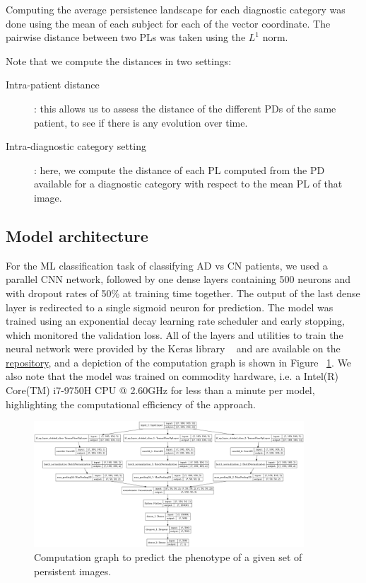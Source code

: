 \documentclass{article}
\begin{document}
Computing the average persistence landscape for each diagnostic category was done using the mean of each subject for each of the vector coordinate. The pairwise distance between two PLs was taken using the $L^1$ norm.

Note that we compute the distances in two settings:
\begin{description}
\item[Intra-patient distance]: this allows us to assess the distance of the different PDs of the same patient, to see if there is any evolution over time.
\item[Intra-diagnostic category setting]: here, we compute the
distance of each PL computed from the PD available for a diagnostic category with respect to the mean PL of that image.
\end{description}

\subsection{Model architecture}
For the ML classification task of classifying AD vs CN patients, we used a parallel CNN network, followed by one dense layers containing 500 neurons and with dropout rates of 50\% at training time together. The output of the last dense layer is redirected to a single sigmoid neuron for prediction. The model was trained using an exponential decay learning rate scheduler and early stopping, which monitored the validation loss. All of the layers and utilities to train the neural network were provided by the Keras library ~\citep{chollet2015keras} and are available on the \href{https://github.com/pjhartout/TDA_ADNI_MLCB}{repository}, and a depiction of the computation graph is shown in Figure ~\ref{fig:model_arch}. We also note that the model was trained on commodity hardware, i.e. a Intel(R) Core(TM) i7-9750H CPU @ 2.60GHz for less than a minute per model, highlighting the computational efficiency of the approach.

\begin{figure}
  \centering
  \includegraphics[width=0.9\textwidth]{figures/model.png}
  \caption{Computation graph to predict the phenotype of a given set of persistent images.}
  \label{fig:model_arch}
\end{figure}
\end{document}
